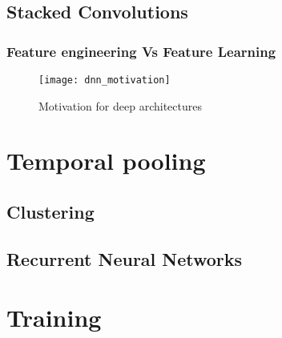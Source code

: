 \subsection{Stacked Convolutions}
\label{stacked}

{\color{gray}
\subsubsection{Feature engineering Vs Feature Learning}
\label{feature}

\begin{figure}[h] 
\centering
\texttt{[image: dnn\_motivation]}
\caption{Motivation for deep architectures}
 \label{fig:deep learning}
 \end{figure}
\FloatBarrier
\bigskip

\section{Temporal pooling}
\label{temporal}
\subsection{Clustering}
\label{clustering}
\subsection{Recurrent Neural Networks}
\label{rnn}

\section{Training}
\label{training}
}
